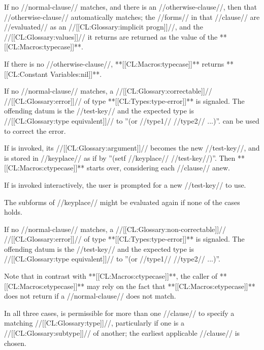 \beginlist


If no //normal-clause// matches, and there is an //otherwise-clause//, then that //otherwise-clause// automatically matches; the //forms// in that //clause// are //evaluated// as an //[[CL:Glossary:implicit progn]]//, and the //[[CL:Glossary:values]]// it returns are returned as the value of the **[[CL:Macros:typecase]]**.

If there is no //otherwise-clause//, **[[CL:Macros:typecase]]** returns **[[CL:Constant Variables:nil]]**.


If no //normal-clause// matches, a //[[CL:Glossary:correctable]]// //[[CL:Glossary:error]]// of type **[[CL:Types:type-error]]** is signaled. The offending datum is the //test-key// and the expected type is //[[CL:Glossary:type equivalent]]// to ''(or //type1// //type2// ...)''.  can be used to correct the error.

If  is invoked, its //[[CL:Glossary:argument]]// becomes the new //test-key//, and is stored in //keyplace// as if by ''(setf //keyplace// //test-key//)''. Then **[[CL:Macros:ctypecase]]** starts over, considering each //clause// anew.

If  is invoked interactively, the user is prompted for a new //test-key// to use.

The subforms of //keyplace// might be evaluated again if none of the cases holds.


If no //normal-clause// matches, a //[[CL:Glossary:non-correctable]]// //[[CL:Glossary:error]]// of type **[[CL:Types:type-error]]** is signaled. The offending datum is the //test-key// and the expected type is //[[CL:Glossary:type equivalent]]// to ''(or //type1// //type2// ...)''.

Note that in contrast with **[[CL:Macros:ctypecase]]**, the caller of **[[CL:Macros:etypecase]]** may rely on the fact that **[[CL:Macros:etypecase]]** does not return if a //normal-clause// does not match.

\endlist

In all three cases, is permissible for more than one //clause// to specify a matching //[[CL:Glossary:type]]//, particularly if one is a //[[CL:Glossary:subtype]]// of another; the earliest applicable //clause// is chosen.

